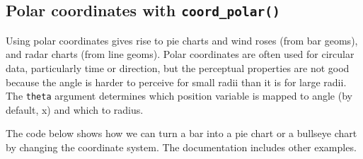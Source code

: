 \hypertarget{polar-coordinates-with-coord_polar}{%
\subsection{\texorpdfstring{Polar coordinates with
\texttt{coord\_polar()}}{Polar coordinates with coord\_polar()}}\label{polar-coordinates-with-coord_polar}}

Using polar coordinates gives rise to pie charts and wind roses (from
bar geoms), and radar charts (from line geoms). Polar coordinates are
often used for circular data, particularly time or direction, but the
perceptual properties are not good because the angle is harder to
perceive for small radii than it is for large radii. The \texttt{theta}
argument determines which position variable is mapped to angle (by
default, x) and which to radius.

The code below shows how we can turn a bar into a pie chart or a
bullseye chart by changing the coordinate system. The documentation
includes other examples. 
 

\begin{Shaded}
\begin{Highlighting}[]
\StringTok{ }\NormalTok{(}\NormalTok{(}\NormalTok{), } \OperatorTok{+}
\StringTok{  }\NormalTok{(} \NormalTok{) }\OperatorTok{+}\StringTok{ }
\StringTok{  }\NormalTok{(} \NormalTok{) }\OperatorTok{+}\StringTok{ }
\StringTok{  }\NormalTok{(}\NormalTok{, } \NormalTok{(}\NormalTok{, }\NormalTok{)) }\OperatorTok{+}
\StringTok{  }\NormalTok{(}\NormalTok{, } \NormalTok{(}\NormalTok{, }\NormalTok{))}


\OperatorTok{+}\StringTok{ }\NormalTok{(} \NormalTok{)}

\OperatorTok{+}\StringTok{ }\NormalTok{()}
\end{Highlighting}
\end{Shaded}

